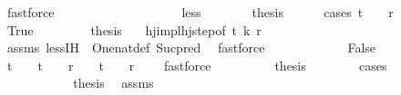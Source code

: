 \begin{isabellebody}
\ fastforce\isanewline
\ \ \ \ \isamarkupfalse%
\isanewline
\ \ \isamarkupfalse%
\isanewline
\ \ \ \ \isamarkupfalse%
\ {}\isanewline
\ \ \ \ \isamarkupfalse%
\ less\isanewline
\ \ \ \ \isamarkupfalse%
\ \isamarkupfalse%
\ {\isacharquery}{\kern0pt}thesis\isanewline
\ \ \ \ \isamarkupfalse%
\ {\isacharparenleft}{\kern0pt}cases\ {\isachardoublequoteopen}t\ {\isachargreater}{\kern0pt}\ {}\ {\isasymand}\ r\ {\isachargreater}{\kern0pt}\ {}{\isachardoublequoteclose}{\isacharparenright}{\kern0pt}\isanewline
\ \ \ \ \ \isamarkupfalse%
\ True\isanewline
\ \ \ \ \ \isamarkupfalse%
\ \isamarkupfalse%
\ {\isacharquery}{\kern0pt}thesis\ \ \isamarkupfalse%
\ hj{\isacharunderscore}{\kern0pt}imp{\isacharunderscore}{\kern0pt}lhj{\isacharunderscore}{\kern0pt}step{\isacharbrackleft}{\kern0pt}of\ t\ {\isachardoublequoteopen}k{\isacharminus}{\kern0pt}{}{\isachardoublequoteclose}\ r{\isacharbrackright}{\kern0pt}\isanewline
\ \ \ \ \ \ \ \isamarkupfalse%
\ assms\ less{\isachardot}{\kern0pt}IH\ {}\ One{\isacharunderscore}{\kern0pt}nat{\isacharunderscore}{\kern0pt}def\ Suc{\isacharunderscore}{\kern0pt}pred\ \isamarkupfalse%
\ fastforce\isanewline
\ \ \ \ \isamarkupfalse%
\isanewline
\ \ \ \ \ \ \isamarkupfalse%
\ False\isanewline
\ \ \ \ \ \ \isamarkupfalse%
\ \isamarkupfalse%
\ {\isachardoublequoteopen}t\ {\isacharequal}{\kern0pt}\ {}{\isachardoublequoteclose}\ {\isacharbar}{\kern0pt}\ {\isachardoublequoteopen}t\ {\isachargreater}{\kern0pt}\ {}\ {\isasymand}\ r\ {\isacharequal}{\kern0pt}\ {}{\isachardoublequoteclose}\ {\isacharbar}{\kern0pt}\ {\isachardoublequoteopen}t\ {\isacharequal}{\kern0pt}\ {}\ {\isasymand}\ r\ {\isacharequal}{\kern0pt}\ {}{\isachardoublequoteclose}\ \isamarkupfalse%
\ fastforce\isanewline
\ \ \ \ \ \ \isamarkupfalse%
\ \isamarkupfalse%
\ {\isacharquery}{\kern0pt}thesis\isanewline
\ \ \ \ \ \ \isamarkupfalse%
\ cases\isanewline
\ \ \ \ \ \ \ \ \isamarkupfalse%
\ {}\isanewline
\ \ \ \ \ \ \ \ \isamarkupfalse%
\ \isamarkupfalse%
\ {\isacharquery}{\kern0pt}thesis\ \isamarkupfalse%
\ assms\ \isamarkupfalse%

\end{isabellebody}
